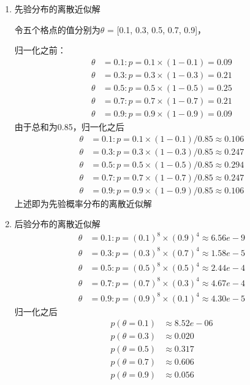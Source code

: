 \documentclass[stu,12pt,floatsintext]{apa7} %
\begin{document}
\begin{enumerate}[itemsep=2pt,topsep=0pt,parsep=0pt,label=(\alph*)]
    \item 先验分布的离散近似解
    
    令五个格点的值分别为\(\theta\) = [0.1, 0.3, 0.5, 0.7, 0.9]，

    归一化之前：
    \begin{align*}
        \theta & =0.1: p = 0.1\times(1-0.1) = 0.09\\
        \theta & =0.3: p = 0.3\times(1-0.3) = 0.21\\
        \theta & =0.5: p = 0.5\times(1-0.5) = 0.25\\
        \theta & =0.7: p = 0.7\times(1-0.7) = 0.21\\
        \theta & =0.9: p = 0.9\times(1-0.9) = 0.09
    \end{align*}
    由于总和为0.85，归一化之后
    \begin{align*}
        \theta & =0.1: p = 0.1\times(1-0.1) /0.85 \approx 0.106\\
        \theta & =0.3: p = 0.3\times(1-0.3) /0.85 \approx 0.247\\
        \theta & =0.5: p = 0.5\times(1-0.5) /0.85 \approx 0.294\\
        \theta & =0.7: p = 0.7\times(1-0.7) /0.85 \approx 0.247\\
        \theta & =0.9: p = 0.9\times(1-0.9) /0.85 \approx 0.106
    \end{align*}
    上述即为先验概率分布的离散近似解
    
    \item 后验分布的离散近似解
    \begin{align*}
        \theta & =0.1: p = (0.1)^8\times(0.9)^4 \approx 6.56e-9\\
        \theta & =0.3: p = (0.3)^8\times(0.7)^4 \approx 1.58e-5\\
        \theta & =0.5: p = (0.5)^8\times(0.5)^4 \approx 2.44e-4\\
        \theta & =0.7: p = (0.7)^8\times(0.3)^4 \approx 4.67e-4\\
        \theta & =0.9: p = (0.9)^8\times(0.1)^4 \approx 4.30e-5
    \end{align*}
    归一化之后
    \begin{align*}
        p(\theta=0.1) & \approx 8.52e-06\\
        p(\theta=0.3) & \approx 0.020\\
        p(\theta=0.5) & \approx 0.317\\
        p(\theta=0.7) & \approx 0.606\\
        p(\theta=0.9) & \approx 0.056
    \end{align*}


\end{enumerate}
\end{document}
